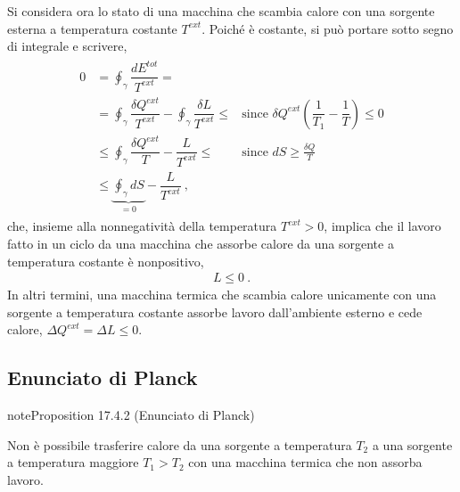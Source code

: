 \documentclass[letterpaper,10pt,italian]{jupyterBook}
\begin{document}
\sphinxAtStartPar
Si considera ora lo stato di una macchina che scambia calore con una sorgente esterna a temperatura costante \(T^{ext}\). Poiché è costante, si può portare sotto segno di integrale e scrivere,
\begin{equation*}
\begin{split}\begin{aligned}
  0 & = \oint_{\gamma} \dfrac{d E^{tot}}{T^{ext}} = \\
    & = \oint_{\gamma} \dfrac{\delta Q^{ext}}{T^{ext}} - \oint_{\gamma} \dfrac{\delta L}{T^{ext}} \le & \text{since } \delta Q^{ext} \left(\dfrac{1}{T_1} - \dfrac{1}{T} \right) \le 0 \\
    & \le \oint_{\gamma} \dfrac{\delta Q^{ext}}{T} - \dfrac{L}{T^{ext}} \le & \text{since } dS \ge \frac{\delta Q}{T} \\
    & \le \underbrace{ \oint_{\gamma} d S}_{=0} - \dfrac{L}{T^{ext}} \ , %
\end{aligned}\end{split}
\end{equation*}
\sphinxAtStartPar
che, insieme alla non\sphinxhyphen{}negatività della temperatura \(T^{ext} >0\), implica che il lavoro fatto in un ciclo da una macchina che assorbe calore da una sorgente a temperatura costante è non\sphinxhyphen{}positivo,
\begin{equation*}
\begin{split}L \le 0 \ .\end{split}
\end{equation*}
\sphinxAtStartPar
In altri termini, una macchina termica che scambia calore unicamente con una sorgente a temperatura costante assorbe lavoro dall’ambiente esterno e cede calore, \(\Delta Q^{ext} = \Delta L \le 0\).


\subsection{Enunciato di Planck}
\label{\detokenize{ch/thermodynamics/heat-engine-second-principle:enunciato-di-planck}}\label{\detokenize{ch/thermodynamics/heat-engine-second-principle:physics-hs-thermodynamics-heat-engine-second-principle-planck}}\label{ch/thermodynamics/heat-engine-second-principle:proposition-1}
\begin{sphinxadmonition}{note}{Proposition 17.4.2 (Enunciato di Planck)}



\sphinxAtStartPar
Non è possibile trasferire calore da una sorgente a temperatura \(T_2\) a una sorgente a temperatura maggiore \(T_1 > T_2\) con una macchina termica che non assorba lavoro.
\end{sphinxadmonition}
\end{document}
